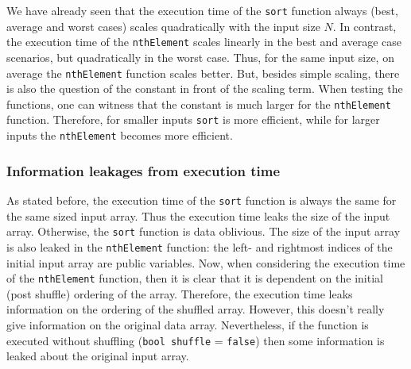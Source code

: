 \documentclass[11pt]{article}
\newcommand{\ct}[1]{\texttt{#1}}
\begin{document}

We have already seen that the execution time of the \ct{sort} function always (best, average and worst cases) scales quadratically with the input size $N$. In contrast, the execution time of the \ct{nthElement} scales linearly in the best and average case scenarios, but quadratically in the worst case. Thus, for the same input size, on average the \ct{nthElement} function scales better. But, besides simple scaling, there is also the question of the constant in front of the scaling term. When testing the functions, one can witness that the constant is much larger for the \ct{nthElement} function. Therefore, for smaller inputs \ct{sort} is more efficient, while for larger inputs the \ct{nthElement} becomes more efficient.      

\subsubsection{Information leakages from execution time} %
\label{ssub:information_leakages_from_execution_time}

As stated before, the execution time of the \ct{sort} function is always the same for the same sized input array. Thus the execution time leaks the size of the input array. Otherwise, the \ct{sort} function is data oblivious. The size of the input array is also leaked in the \ct{nthElement} function: the left- and rightmost indices of the initial input array are public variables. Now, when considering the execution time of the \ct{nthElement} function, then it is clear that it is dependent on the initial (post shuffle) ordering of the array. Therefore, the execution time leaks information on the ordering of the shuffled array. However, this doesn't really give information on the original data array. Nevertheless, if the function is executed without shuffling (\ct{bool shuffle} = \ct{false}) then some information is leaked about the original input array.

\end{document}
